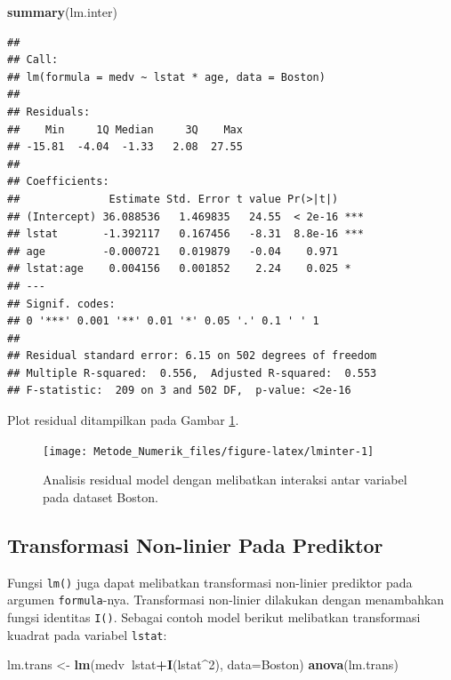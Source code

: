 \documentclass[]{book}
\newenvironment{Shaded}{\begin{snugshade}}{\end{snugshade}}
\newcommand{\DataTypeTok}[1]{\textcolor[rgb]{0.13,0.29,0.53}{#1}}
\newcommand{\DecValTok}[1]{\textcolor[rgb]{0.00,0.00,0.81}{#1}}
\newcommand{\KeywordTok}[1]{\textcolor[rgb]{0.13,0.29,0.53}{\textbf{#1}}}
\newcommand{\NormalTok}[1]{#1}
\newcommand{\OperatorTok}[1]{\textcolor[rgb]{0.81,0.36,0.00}{\textbf{#1}}}
\newcommand{\StringTok}[1]{\textcolor[rgb]{0.31,0.60,0.02}{#1}}
\theoremstyle{definition}
\theoremstyle{definition}
\theoremstyle{definition}
\theoremstyle{remark}
\begin{document}
\begin{Shaded}
\begin{Highlighting}[]
\KeywordTok{summary}\NormalTok{(lm.inter)}
\end{Highlighting}
\end{Shaded}

\begin{verbatim}
## 
## Call:
## lm(formula = medv ~ lstat * age, data = Boston)
## 
## Residuals:
##    Min     1Q Median     3Q    Max 
## -15.81  -4.04  -1.33   2.08  27.55 
## 
## Coefficients:
##              Estimate Std. Error t value Pr(>|t|)    
## (Intercept) 36.088536   1.469835   24.55  < 2e-16 ***
## lstat       -1.392117   0.167456   -8.31  8.8e-16 ***
## age         -0.000721   0.019879   -0.04    0.971    
## lstat:age    0.004156   0.001852    2.24    0.025 *  
## ---
## Signif. codes:  
## 0 '***' 0.001 '**' 0.01 '*' 0.05 '.' 0.1 ' ' 1
## 
## Residual standard error: 6.15 on 502 degrees of freedom
## Multiple R-squared:  0.556,  Adjusted R-squared:  0.553 
## F-statistic:  209 on 3 and 502 DF,  p-value: <2e-16
\end{verbatim}

Plot residual ditampilkan pada Gambar \ref{fig:lminter}.

\begin{figure}

{\centering \texttt{[image: Metode\_Numerik\_files/figure-latex/lminter-1]} 

}

\caption{Analisis residual model dengan melibatkan interaksi antar variabel pada dataset Boston.}\label{fig:lminter}
\end{figure}

\hypertarget{nlinpred}{%
\subsection{Transformasi Non-linier Pada Prediktor}\label{nlinpred}}

Fungsi \texttt{lm()} juga dapat melibatkan transformasi non-linier prediktor pada argumen \texttt{formula}-nya. Transformasi non-linier dilakukan dengan menambahkan fungsi identitas \texttt{I()}. Sebagai contoh model berikut melibatkan transformasi kuadrat pada variabel \texttt{lstat}:

\begin{Shaded}
\begin{Highlighting}[]
\NormalTok{lm.trans <-}\StringTok{ }\KeywordTok{lm}\NormalTok{(medv}\OperatorTok{~}\NormalTok{lstat}\OperatorTok{+}\KeywordTok{I}\NormalTok{(lstat}\OperatorTok{^}\DecValTok{2}\NormalTok{), }\DataTypeTok{data=}\NormalTok{Boston)}
\KeywordTok{anova}\NormalTok{(lm.trans)}
\end{Highlighting}
\end{Shaded}
\end{document}
